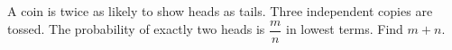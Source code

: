 A coin is twice as likely to show heads as tails. Three independent copies are tossed. The probability of exactly two heads is $\dfrac{m}{n}$ in lowest terms. Find $ m+n $.
